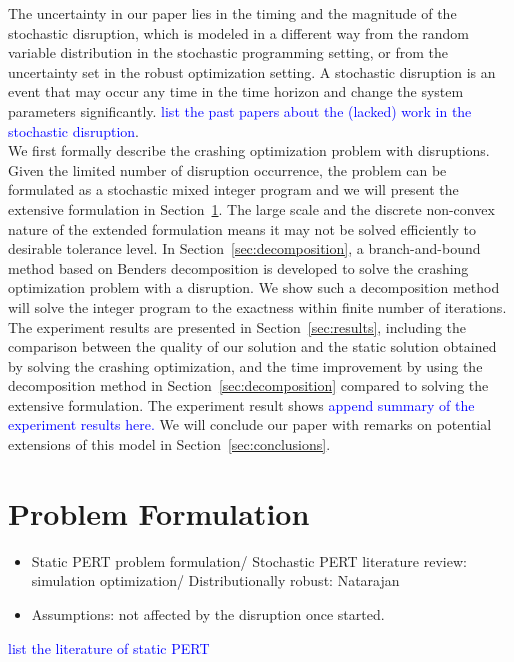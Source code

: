 \documentclass[11pt]{article}
\begin{document}
	\newline
	The uncertainty in our paper lies in the timing and the magnitude of the stochastic disruption, which is modeled in a different way from the random variable distribution in the stochastic programming setting, or from the uncertainty set in the robust optimization setting. A stochastic disruption is an event that may occur any time in the time horizon and change the system parameters significantly. \textcolor{blue}{list the past papers about the (lacked) work in the stochastic disruption}.\\
	\newline
	We first formally describe the crashing optimization problem with disruptions. Given the limited number of disruption occurrence, the problem can be formulated as a stochastic mixed integer program and we will present the extensive formulation in Section~\ref{sec:formulation}. The large scale and the discrete non-convex nature of the extended formulation means it may not be solved efficiently to desirable tolerance level. In Section~\ref{sec:decomposition}, a branch-and-bound method based on Benders decomposition is developed to solve the crashing optimization problem with a disruption. We show such a decomposition method will solve the integer program to the exactness within finite number of iterations. \\
	\newline
	The experiment results are presented in Section~\ref{sec:results}, including the comparison between the quality of our solution and the static solution obtained by solving the crashing optimization, and the time improvement by using the decomposition method in Section~\ref{sec:decomposition} compared to solving the extensive formulation. The experiment result shows \textcolor{blue}{append summary of the experiment results here.} We will conclude our paper with remarks on potential extensions of this model in Section~\ref{sec:conclusions}.
	
\section{Problem Formulation} \label{sec:formulation}
	\begin{itemize}
		\item Static PERT problem formulation/ Stochastic PERT literature review: simulation optimization/ Distributionally robust: Natarajan
		\item Assumptions: not affected by the disruption once started.
	\end{itemize}
	\textcolor{blue}{list the literature of static PERT}
	
\end{document}
